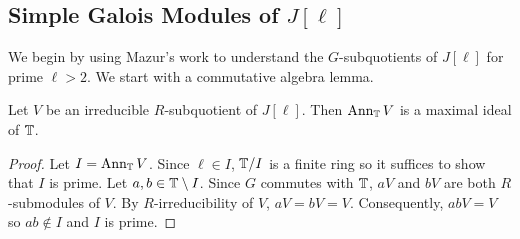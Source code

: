 \documentclass{article}
\begin{document}
\subsection{Simple Galois Modules of $J[\ell]$}\label{subsection:simple_galois_ell}

We begin by using Mazur's work to understand the $G$-subquotients of $J[\ell]$
for prime $\ell>2$. We start with a commutative algebra lemma.

\begin{lemma}\label{lemma:cherry_street}
    Let $V$ be an irreducible $R$-subquotient of $J[\ell]$. Then $\operatorname{Ann}_{\mathbb{T}} V$
    is a maximal ideal of $\mathbb{T}$.
\end{lemma}
\begin{proof}
    Let $I=\operatorname{Ann}_{\mathbb{T}} V$. Since $\ell\in I$, $\mathbb{T}/I$ is a finite ring so it
    suffices to show that $I$ is prime. Let $a,b\in \mathbb{T}\setminus I$. Since $G$
    commutes with $\mathbb{T}$, $aV$ and $bV$ are both $R$-submodules of $V$. By
    $R$-irreducibility of $V$, $aV=bV=V$. Consequently, $abV=V$ so $ab\notin I$
    and $I$ is prime.
\end{proof}
\end{document}
